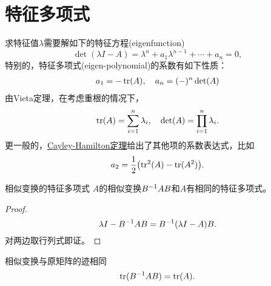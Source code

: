\section{特征多项式}
求特征值$\lambda$需要解如下的特征方程(eigenfunction)
\[
	\det(\lambda I-A)=\lambda^n+a_1\lambda^{n-1}+\cdots+a_n=0,
\]
特别的，特征多项式(eigen-polynomial)的系数有如下性质：
\begin{align}
	a_1=-\operatorname{tr}(A),\quad a_n=(-)^n\det(A)
\end{align}
由Vieta定理，在考虑重根的情况下，
\begin{align}
	\operatorname{tr}(A)=\sum_{i=1}^n\lambda_i,\quad \det(A)=\prod_{i=1}^n\lambda_i.
\end{align}
更一般的，\href{https://en.wikipedia.org/wiki/Cayley%E2%80%93Hamilton_theorem}{Cayley-Hamilton定理}给出了其他项的系数表达式，比如
\[
	a_2=\frac12\bigl(\operatorname{tr}^2(A)-\operatorname{tr}(A^2)\bigr).
\]
\begin{theorem}{相似变换的特征多项式}{}
	$A$的相似变换$B^{-1} AB$和$A$有相同的特征多项式。
\end{theorem}
\begin{proof}
	\[
		\lambda I-B^{-1} AB=B^{-1}(\lambda I-A)B.
	\]
	对两边取行列式即证。
\end{proof}
\begin{corollary}
	相似变换与原矩阵的迹相同
	\begin{equation}
		\operatorname{tr}(B^{-1} AB)=\operatorname{tr}(A).
	\end{equation}
\end{corollary}

